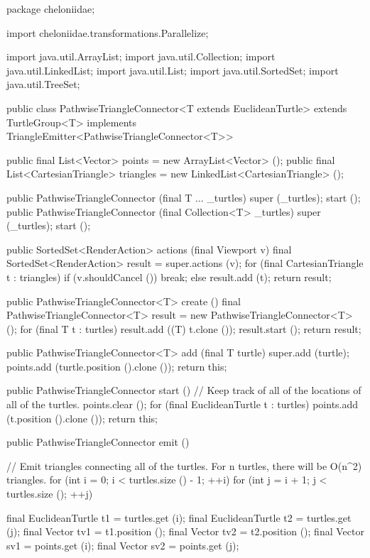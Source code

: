 \documentclass{report}
\begin{document}
\begin{javacode}
package cheloniidae;

import cheloniidae.transformations.Parallelize;

import java.util.ArrayList;
import java.util.Collection;
import java.util.LinkedList;
import java.util.List;
import java.util.SortedSet;
import java.util.TreeSet;

public class PathwiseTriangleConnector<T extends EuclideanTurtle>
     extends TurtleGroup<T>
  implements TriangleEmitter<PathwiseTriangleConnector<T>> {

  public final List<Vector>            points    = new ArrayList<Vector> ();
  public final List<CartesianTriangle> triangles = new LinkedList<CartesianTriangle> ();

  public PathwiseTriangleConnector (final T ...         _turtles) {super (_turtles); start ();}
  public PathwiseTriangleConnector (final Collection<T> _turtles) {super (_turtles); start ();}

  public SortedSet<RenderAction> actions (final Viewport v) {
    final SortedSet<RenderAction> result = super.actions (v);
    for (final CartesianTriangle t : triangles) if (v.shouldCancel ()) break;
                                                else                   result.add (t);
    return result;
  }

  public PathwiseTriangleConnector<T> create () {
    final PathwiseTriangleConnector<T> result = new PathwiseTriangleConnector<T> ();
    for (final T t : turtles) result.add ((T) t.clone ());
    result.start ();
    return result;
  }

  public PathwiseTriangleConnector<T> add (final T turtle) {
    super.add (turtle);
    points.add (turtle.position ().clone ());
    return this;
  }

  public PathwiseTriangleConnector start () {
    // Keep track of all of the locations of all of the turtles.
    points.clear ();
    for (final EuclideanTurtle t : turtles) points.add (t.position ().clone ());
    return this;
  }

  public PathwiseTriangleConnector emit () {
    // Emit triangles connecting all of the turtles. For n turtles, there will be O(n^2) triangles.
    for (int i = 0; i < turtles.size () - 1; ++i)
      for (int j = i + 1; j < turtles.size (); ++j) {
        final EuclideanTurtle t1  = turtles.get (i);
        final EuclideanTurtle t2  = turtles.get (j);
        final Vector          tv1 = t1.position ();
        final Vector          tv2 = t2.position ();
        final Vector          sv1 = points.get (i);
        final Vector          sv2 = points.get (j);

}}}
\end{javacode}
\end{document}
